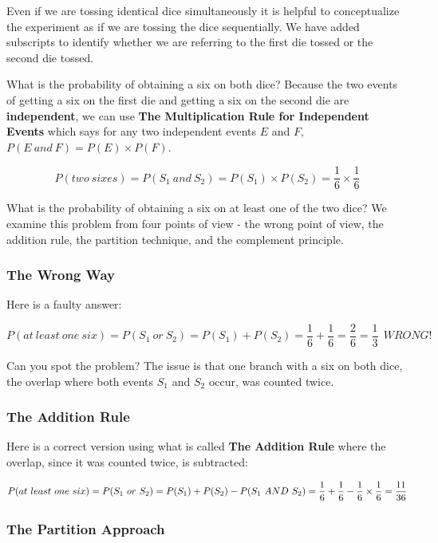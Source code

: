 \documentclass[]{book}
\theoremstyle{definition}
\theoremstyle{definition}
\theoremstyle{definition}
\theoremstyle{remark}
\begin{document}
Even if we are tossing identical dice simultaneously it is helpful to
conceptualize the experiment as if we are tossing the dice sequentially.
We have added subscripts to identify whether we are referring to the
first die tossed or the second die tossed.

What is the probability of obtaining a six on both dice? Because the two
events of getting a six on the first die and getting a six on the second
die are \textbf{independent}, we can use \textbf{The Multiplication Rule
for Independent Events} which says for any two independent events \(E\)
and \(F\), \(P(E\ and\ F) = P(E) \times P(F)\).

\[P(two\ sixes) = P(S_{1}\ and\ S_{2}) = P(S_{1}) \times P(S_{2}) =  \frac{1}{6} \times \frac{1}{6}\]

What is the probability of obtaining a six on at least one of the two
dice? We examine this problem from four points of view - the wrong point
of view, the addition rule, the partition technique, and the complement
principle.

\subsubsection{The Wrong Way}\label{the-wrong-way}

Here is a faulty answer:

\[P(at\ least\ one\ six) = P(S_{1}\ or\ S_{2}) = P(S_{1})+ P(S_{2}) = \frac{1}{6} + \frac{1}{6} = \frac{2}{6} = \frac{1}{3}\ \ WRONG!\]

Can you spot the problem? The issue is that one branch with a six on
both dice, the overlap where both events \(S_{1}\) and \(S_{2}\) occur,
was counted twice.

\subsubsection{The Addition Rule}\label{the-addition-rule}

Here is a correct version using what is called \textbf{The Addition
Rule} where the overlap, since it was counted twice, is subtracted:

\[P(at\ least\ one\ six) = P(S_{1}\ or\ S_{2}) = P(S_{1})+ P(S_{2}) - P(S_{1}\ AND\ S_{2}) =\\ \frac{1}{6} + \frac{1}{6} - \frac{1}{6} \times \frac{1}{6}  = \frac{11}{36}\]

\subsubsection{The Partition Approach}\label{the-partition-approach}
\end{document}

